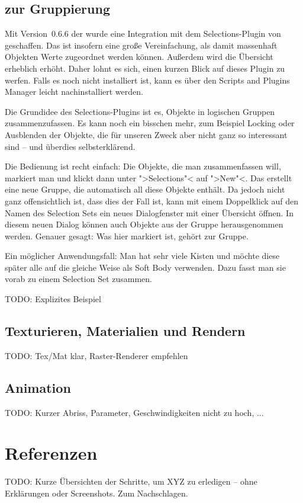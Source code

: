\documentclass[10pt,DIV=14,a4paper]{scrartcl}
\begin{document}
\subsection{ zur Gruppierung}
Mit Version~0.6.6 der \fluidsim wurde eine Integration mit dem
Selections-Plugin von \aoi geschaffen. Das ist insofern eine große
Vereinfachung, als damit massenhaft Objekten Werte zugeordnet werden
können. Außerdem wird die Übersicht erheblich erhöht. Daher lohnt es
sich, einen kurzen Blick auf dieses Plugin zu werfen. Falls es noch
nicht installiert ist, kann es über den Scripts and Plugins Manager
leicht nachinstalliert werden.

Die Grundidee des Selections-Plugins ist es, Objekte in logischen
Gruppen zusammenzufassen. Es kann noch ein bisschen mehr, zum Beispiel
Locking oder Ausblenden der Objekte, die für unseren Zweck aber nicht
ganz so interessant sind -- und überdies selbst\-er\-klä\-rend.

Die Bedienung ist recht einfach: Die Objekte, die man zusammenfassen
will, markiert man und klickt dann unter ">Selections"< auf ">New"<. Das
erstellt eine neue Gruppe, die automatisch all diese Objekte enthält. Da
jedoch nicht ganz offensichtlich ist, dass dies der Fall ist, kann mit
einem Doppelklick auf den Namen des Selection Sets ein neues
Dialogfenster mit einer Übersicht öffnen. In diesem neuen Dialog können
auch Objekte aus der Gruppe herausgenommen werden. Genauer gesagt: Was
hier markiert ist, gehört zur Gruppe.

Ein möglicher Anwendungsfall: Man hat sehr viele Kisten und möchte diese
später alle auf die gleiche Weise als Soft Body verwenden. Dazu fasst
man sie vorab zu einem Selection Set zusammen.

TODO: Explizites Beispiel

\subsection{Texturieren, Materialien und Rendern}
TODO: Tex/Mat klar, Raster-Renderer empfehlen

\subsection{Animation}
TODO: Kurzer Abriss, Parameter, Geschwindigkeiten nicht zu hoch, ...



\pagebreak
\section{Referenzen}
TODO: Kurze Übersichten der Schritte, um XYZ zu erledigen -- ohne
Erklärungen oder Screenshots. Zum Nachschlagen.
\end{document}
